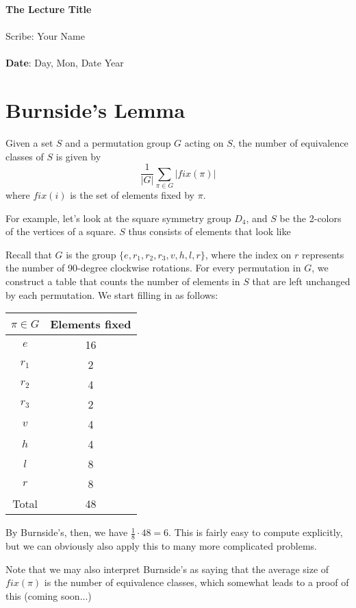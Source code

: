 \documentclass[11pt,twosided]{article}
\def\titlestring{The Lecture Title}
\def\scribestring{Your Name}
\def\datestring{Day, Mon, Date Year}
\begin{document}
\thispagestyle{plain}  %

{\LARGE \textbf{\titlestring}}\\\\
%
{\Large Scribe: \scribestring}\\ \\
{\textbf{Date}: \datestring}


\noindent

\section{Burnside's Lemma}
Given a set $S$ and a permutation group $G$ acting on $S$, the number of equivalence classes of $S$ is given by 
\[
\frac{1}{|G|} \sum_{\pi \in G} |fix(\pi)|
\]
where $fix(i)$ is the set of elements fixed by $\pi$. 

For example, let's look at the square symmetry group $D_4$, and $S$ be the 2-colors of the vertices of a square. $S$ thus consists of elements that look like


Recall that $G$ is the group $\{ e, r_1, r_2, r_3, v, h, l, r\}$, where the index on $r$ represents the number of 90-degree clockwise rotations. For every permutation in $G$, we construct a table that counts the number of elements in $S$ that are left unchanged by each permutation. We start filling in as follows: 
\begin{center}
\begin{tabular}{c|c}
$\pi \in G$ & Elements fixed  \\ \hline 
$e$ & 16  \\
$r_1$ & 2 \\
$r_2$ & 4 \\
$r_3$ & 2 \\
$v$ & 4 \\
$h$ & 4 \\
$l$ & 8 \\
$r$ & 8 \\ \hline
Total & 48
\end{tabular}
\end{center}
By Burnside's, then, we have $\frac{1}{8} \cdot 48 = 6$. This is fairly easy to compute explicitly, but we can obviously also apply this to many more complicated problems.

Note that we may also interpret Burnside's as saying that the average size of $fix(\pi)$ is the number of equivalence classes, which somewhat leads to a proof of this (coming soon...)
\end{document}
